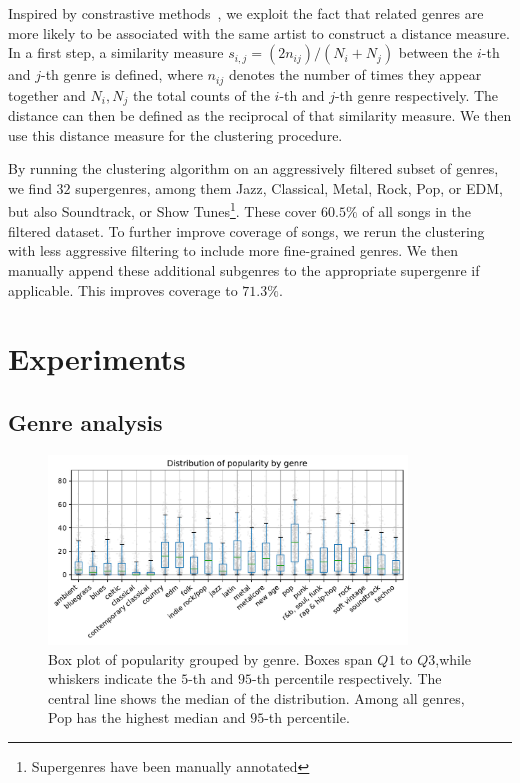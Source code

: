 \documentclass{article}
\begin{document}
Inspired by constrastive methods~\cite{mikolov2013efficient, chen2020simple}, we exploit the fact that related genres are more likely to be associated with the same artist to construct a distance measure. In a first step, a similarity measure $s_{i, j} = (2 n_{ij}) / (N_i + N_j)$ between the $i$-th and $j$-th genre is defined, where $n_{ij}$ denotes the number of times they appear together and $N_i, N_j$ the total counts of the $i$-th and $j$-th genre respectively. The distance can then be defined as the reciprocal of that similarity measure. We then use this distance measure for the clustering procedure.

By running the clustering algorithm on an aggressively filtered subset of genres, we find $32$ supergenres, among them Jazz, Classical, Metal, Rock, Pop, or EDM, but also Soundtrack, or Show Tunes\footnote{Supergenres have been manually annotated}. These cover $60.5\%$ of all songs in the filtered dataset. To further improve coverage of songs, we rerun the clustering with less aggressive filtering to include more fine-grained genres. We then manually append these additional subgenres to the appropriate supergenre if applicable. This improves coverage to $71.3\%$.

\section{Experiments}

\subsection{Genre analysis}

\begin{figure}
  \centering
  \includegraphics[width=0.85\textwidth]{../figures/popularity_distribution_by_genre.pdf}
  \caption{Box plot of popularity grouped by genre. Boxes span $Q1$ to $Q3$,while whiskers indicate the $5$-th and $95$-th percentile respectively. The central line shows the median of the distribution. Among all genres, Pop has the highest median and $95$-th percentile.}
  \label{fig:genre_boxplot}
\end{figure}
\end{document}
